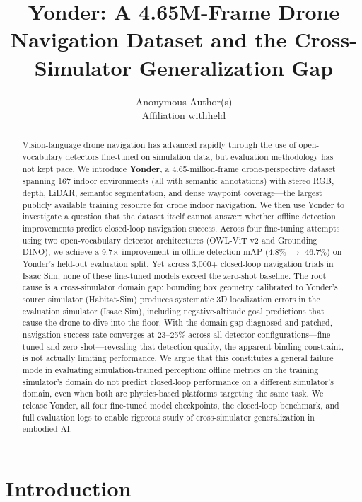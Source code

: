\documentclass{article}
\title{Yonder: A 4.65M-Frame Drone Navigation Dataset and the Cross-Simulator Generalization Gap}
\author{%
  Anonymous Author(s) \\
  Affiliation withheld \\
}
\begin{document}
\maketitle

\begin{abstract}
Vision-language drone navigation has advanced rapidly through the use of open-vocabulary detectors fine-tuned on simulation data, but evaluation methodology has not kept pace. We introduce \textbf{Yonder}, a 4.65-million-frame drone-perspective dataset spanning 167 indoor environments (all with semantic annotations) with stereo RGB, depth, LiDAR, semantic segmentation, and dense waypoint coverage---the largest publicly available training resource for drone indoor navigation. We then use Yonder to investigate a question that the dataset itself cannot answer: whether offline detection improvements predict closed-loop navigation success. Across four fine-tuning attempts using two open-vocabulary detector architectures (OWL-ViT v2 and Grounding DINO), we achieve a 9.7$\times$ improvement in offline detection mAP (4.8\% $\rightarrow$ 46.7\%) on Yonder's held-out evaluation split. Yet across 3,000+ closed-loop navigation trials in Isaac Sim, none of these fine-tuned models exceed the zero-shot baseline. The root cause is a cross-simulator domain gap: bounding box geometry calibrated to Yonder's source simulator (Habitat-Sim) produces systematic 3D localization errors in the evaluation simulator (Isaac Sim), including negative-altitude goal predictions that cause the drone to dive into the floor. With the domain gap diagnosed and patched, navigation success rate converges at 23--25\% across all detector configurations---fine-tuned and zero-shot---revealing that detection quality, the apparent binding constraint, is not actually limiting performance. We argue that this constitutes a general failure mode in evaluating simulation-trained perception: offline metrics on the training simulator's domain do not predict closed-loop performance on a different simulator's domain, even when both are physics-based platforms targeting the same task. We release Yonder, all four fine-tuned model checkpoints, the closed-loop benchmark, and full evaluation logs to enable rigorous study of cross-simulator generalization in embodied AI.
\end{abstract}

\section{Introduction}
\end{document}
